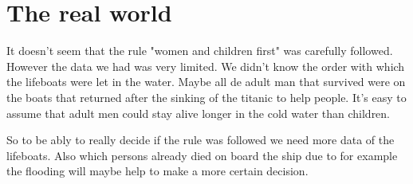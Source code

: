 \documentclass[a4]{article}
\begin{document}
\section{The real world}
It doesn't seem that the rule "women and children first" was carefully followed. However the data we had was very limited. We didn't know the order with which the lifeboats were let in the water. Maybe all de adult man that survived were on the boats that returned after the sinking of the titanic to help people. It's easy to assume that adult men could stay alive longer in the cold water than children.\par
So to be ably to really decide if the rule was followed we need more data of the lifeboats. Also which persons already died on board the ship due to for example the flooding will maybe help to make a more certain decision.
\printbibliography
\end{document}
